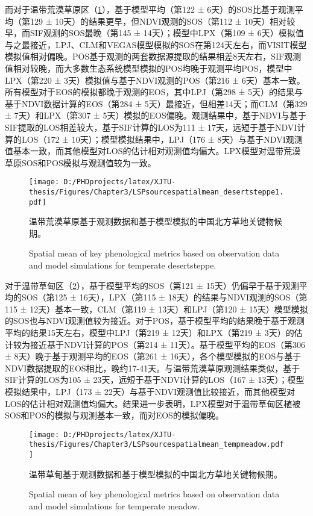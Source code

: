 而对于温带荒漠草原区（\cref{figure36}），基于模型平均（第122 ± 6天）的SOS比基于观测平均（第129 ± 10天）的结果更早，但NDVI观测的SOS（第112 ± 10天）相对较早，而SIF观测的SOS最晚（第145 ± 14天）；模型中LPX（第109 ± 6天）模拟值与之最接近，LPJ、CLM和VEGAS模型模拟的SOS在第124天左右，而VISIT模型模拟值相对偏晚。POS基于观测的两套数据源提取的结果相差8天左右，SIF观测值相对较晚，而大多数生态系统模型模拟的POS均晚于观测平均POS，模型中LPX（第220 ± 3天）模拟值与基于NDVI观测的POS（第216 ± 6天）基本一致。所有模型对于EOS的模拟都晚于观测的EOS，其中LPJ（第298 ± 5天）的结果与基于NDVI数据计算的EOS（第284 ± 5天）最接近，但相差14天；而CLM（第329 ± 7天）和LPX（第307 ± 5天）模拟的EOS偏晚。观测结果中，基于NDVI与基于SIF提取的LOS相差较大，基于SIF计算的LOS为111 ± 17天，远短于基于NDVI计算的LOS（172 ± 10天）；模型模拟结果中，LPJ（176 ± 8天）与基于NDVI观测值基本一致，而其他模型对LOS的估计相对观测值均偏大。LPX模型对温带荒漠草原SOS和POS模拟与观测值较为一致。

\begin{figure}[h]
  \centering
  \texttt{[image: D:/PHDprojects/latex/XJTU-thesis/Figures/Chapter3/LSPsourcespatialmean\_desertsteppe1.pdf]}
  \caption{温带荒漠草原基于观测数据和基于模型模拟的中国北方草地关键物候期。}
  \addtocounter{figure}{-1}
  \vspace{5pt}
  \renewcommand{\figurename}{Fig}
  \caption{Spatial mean of key phenological metrics based on observation data and model simulations for temperate desertsteppe.}
  \label{figure36}
\end{figure}

对于温带草甸区（\cref{figure37}），基于模型平均的SOS（第121 ± 15天）仍偏早于基于观测平均的SOS（第125 ± 16天），LPX（第115 ± 18天）的结果与NDVI观测的SOS（第115 ± 12天）基本一致，CLM（第119 ± 13天）和LPJ（第120 ± 15天）模型模拟的SOS也与NDVI观测值较为接近。对于POS，基于模型平均的结果晚于基于观测平均的结果15天左右，模型中LPJ（第219 ± 12天）和LPX（第219 ± 3天）的估计较为接近基于NDVI计算的POS（第214 ± 11天）。基于模型平均的EOS（第306 ± 8天）晚于基于观测平均的EOS（第261 ± 16天），各个模型模拟的EOS与基于NDVI数据提取的EOS相比，晚约17-41天。与温带荒漠草原观测结果类似，基于SIF计算的LOS为105 ± 23天，远短于基于NDVI计算的LOS（167 ± 13天）；模型模拟结果中，LPJ（173 ± 22天）与基于NDVI观测值比较接近，而其他模型对LOS的估计相对观测值均偏大。结果进一步表明，LPX模型对于温带草甸区植被SOS和POS的模拟与观测基本一致，而对EOS的模拟偏晚。

\begin{figure}[h]
  \centering
  \texttt{[image: D:/PHDprojects/latex/XJTU-thesis/Figures/Chapter3/LSPsourcespatialmean\_tempmeadow.pdf]}
  \caption{温带草甸基于观测数据和基于模型模拟的中国北方草地关键物候期。}
  \addtocounter{figure}{-1}
  \vspace{5pt}
  \renewcommand{\figurename}{Fig}
  \caption{Spatial mean of key phenological metrics based on observation data and model simulations for temperate meadow.}
  \label{figure37}
\end{figure}

